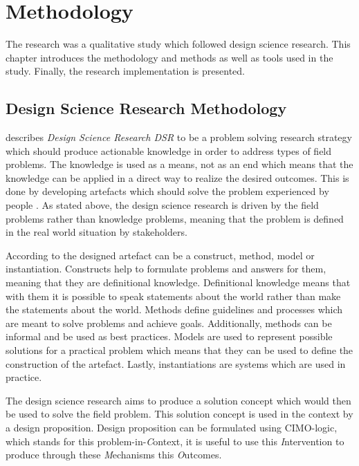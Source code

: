 \chapter{Methodology}
\label{chapter:methods}

The research was a qualitative study which followed design science research. This chapter introduces the methodology and methods as well as tools used in the study. Finally, the research implementation is presented.

\section{Design Science Research Methodology}
\label{section:overview}

\textcite{Aken:2014} describes \emph{Design Science Research DSR} to be a problem solving research strategy which should produce actionable knowledge in order to address types of field problems. The knowledge is used as a means, not as an end which means that the knowledge can be applied in a direct way to realize the desired outcomes. This is done by developing artefacts which should solve the problem experienced by people \parencite{Johannesson:2014}. As stated above, the design science research is driven by the field problems rather than knowledge problems, meaning that the problem is defined in the real world situation by stakeholders. 

According to \textcite{Johannesson:2014} the designed artefact can be a construct, method, model or instantiation. Constructs help to formulate problems and answers for them, meaning that they are definitional knowledge. Definitional knowledge means that with them it is possible to speak statements about the world rather than make the statements about the world. Methods define guidelines and processes which are meant to solve problems and achieve goals. Additionally, methods can be informal and be used as best practices. Models are used to represent possible solutions for a practical problem which means that they can be used to define the construction of the artefact. Lastly, instantiations are systems which are used in practice.

The design science research aims to produce a solution concept which would then be used to solve the field problem. This solution concept is used in the context by a design proposition. Design proposition can be formulated using CIMO-logic, which stands for this problem-in-\emph{C}ontext, it is useful to use this \emph{I}ntervention to produce through these \emph{M}echanisms this \emph{O}utcomes.

